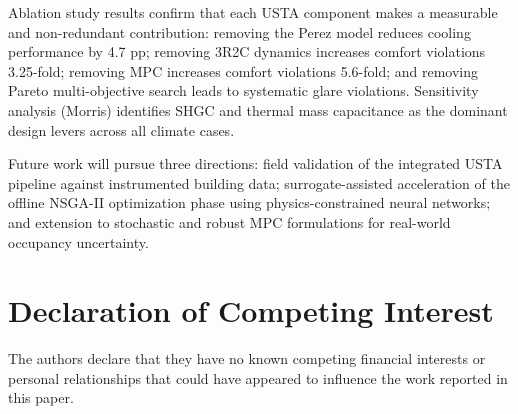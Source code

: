 \documentclass[5p,times,twocolumn]{elsarticle}
\begin{document}
Ablation study results confirm that each USTA component makes a measurable and non-redundant contribution: removing the Perez model reduces cooling performance by 4.7 pp; removing 3R2C dynamics increases comfort violations 3.25-fold; removing MPC increases comfort violations 5.6-fold; and removing Pareto multi-objective search leads to systematic glare violations. Sensitivity analysis (Morris) identifies SHGC and thermal mass capacitance as the dominant design levers across all climate cases.

Future work will pursue three directions: field validation of the integrated USTA pipeline against instrumented building data; surrogate-assisted acceleration of the offline NSGA-II optimization phase using physics-constrained neural networks; and extension to stochastic and robust MPC formulations for real-world occupancy uncertainty.

\section*{Declaration of Competing Interest}
The authors declare that they have no known competing financial interests or personal relationships that could have appeared to influence the work reported in this paper.


\end{document}
